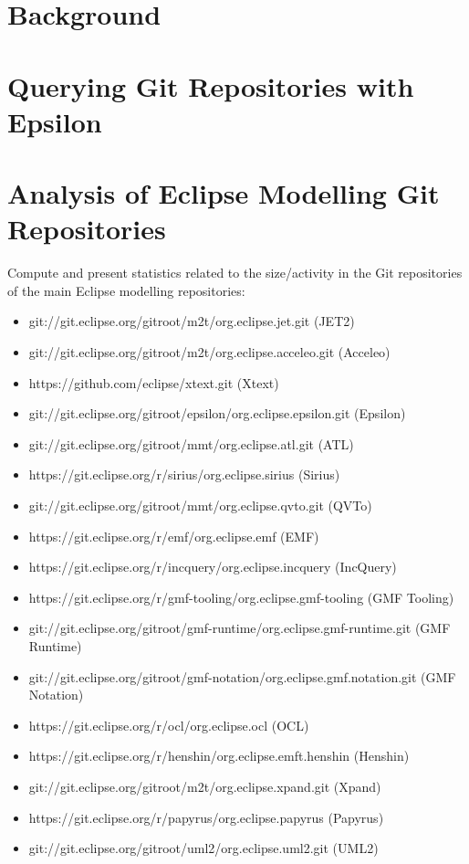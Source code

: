 \documentclass[runningheads,a4paper]{llncs}
\begin{document}
\section{Background}

\section{Querying Git Repositories with Epsilon}

\section{Analysis of Eclipse Modelling Git Repositories}
Compute and present statistics related to the size/activity in the Git repositories of the main Eclipse modelling repositories:

\begin{itemize}
  \item git://git.eclipse.org/gitroot/m2t/org.eclipse.jet.git (JET2)
  \item git://git.eclipse.org/gitroot/m2t/org.eclipse.acceleo.git (Acceleo)
  \item https://github.com/eclipse/xtext.git (Xtext)
  \item git://git.eclipse.org/gitroot/epsilon/org.eclipse.epsilon.git (Epsilon)
  \item git://git.eclipse.org/gitroot/mmt/org.eclipse.atl.git (ATL)
  \item https://git.eclipse.org/r/sirius/org.eclipse.sirius (Sirius)
  \item git://git.eclipse.org/gitroot/mmt/org.eclipse.qvto.git (QVTo)
  \item https://git.eclipse.org/r/emf/org.eclipse.emf (EMF)
  \item https://git.eclipse.org/r/incquery/org.eclipse.incquery (IncQuery)
  \item https://git.eclipse.org/r/gmf-tooling/org.eclipse.gmf-tooling (GMF Tooling)
  \item git://git.eclipse.org/gitroot/gmf-runtime/org.eclipse.gmf-runtime.git (GMF Runtime)
  \item git://git.eclipse.org/gitroot/gmf-notation/org.eclipse.gmf.notation.git  (GMF Notation)
  \item https://git.eclipse.org/r/ocl/org.eclipse.ocl (OCL)
  \item https://git.eclipse.org/r/henshin/org.eclipse.emft.henshin (Henshin)
  \item git://git.eclipse.org/gitroot/m2t/org.eclipse.xpand.git (Xpand)
  \item https://git.eclipse.org/r/papyrus/org.eclipse.papyrus (Papyrus)
  \item git://git.eclipse.org/gitroot/uml2/org.eclipse.uml2.git (UML2)
\end{itemize}
\end{document}
